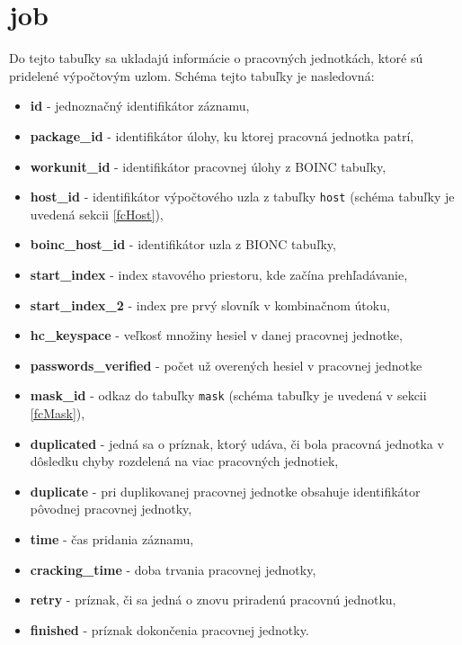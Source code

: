 \documentclass[zadani,slovak]{fitthesis}
\begin{document}
\section{job}
Do tejto tabuľky sa ukladajú informácie o pracovných jednotkách, ktoré sú pridelené výpočtovým uzlom. Schéma tejto tabuľky je nasledovná:
\begin{itemize}
    \item \textbf{id} - jednoznačný identifikátor záznamu,
    \item \textbf{package\_id} - identifikátor úlohy, ku ktorej pracovná jednotka patrí,
    \item \textbf{workunit\_id} - identifikátor pracovnej úlohy z BOINC tabuľky,
    \item \textbf{host\_id} - identifikátor výpočtového uzla z tabuľky \texttt{host} (schéma tabuľky je uvedená sekcii \ref{fcHost}),
    \item \textbf{boinc\_host\_id} - identifikátor uzla z BIONC tabuľky,
    \item \textbf{start\_index} - index stavového priestoru, kde začína prehľadávanie,
    \item \textbf{start\_index\_2} - index pre prvý slovník v kombinačnom útoku,
    \item \textbf{hc\_keyspace} - veľkosť množiny hesiel v danej pracovnej jednotke, 
    \item \textbf{passwords\_verified} - počet už overených hesiel v pracovnej jednotke 
    \item \textbf{mask\_id} -  odkaz do tabuľky \texttt{mask} (schéma tabuľky je uvedená v sekcii \ref{fcMask}),
    \item \textbf{duplicated} - jedná sa o príznak, ktorý udáva, či bola pracovná jednotka v dôsledku chyby rozdelená na viac pracovných jednotiek,
    \item \textbf{duplicate} - pri duplikovanej pracovnej jednotke obsahuje identifikátor pôvodnej pracovnej jednotky,
    \item \textbf{time} - čas pridania záznamu,
    \item \textbf{cracking\_time} - doba trvania pracovnej jednotky,
    \item \textbf{retry} - príznak, či sa jedná o znovu priradenú pracovnú jednotku,
    \item \textbf{finished} - príznak dokončenia pracovnej jednotky.
    
\end{itemize}
\end{document}
